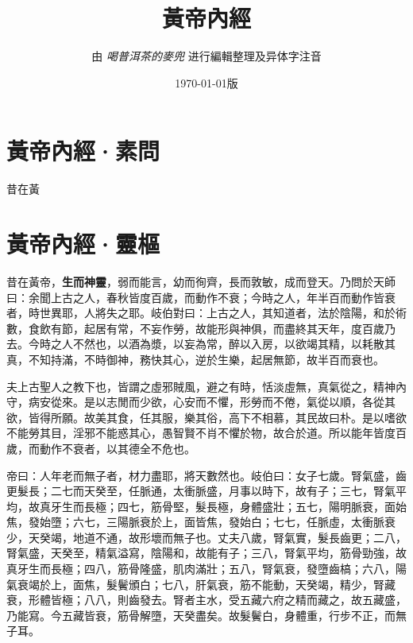 \documentclass[a4paper,zihao=-4,twoside,landscape,UTF8]{ctexart}
\title{黃帝內經}
\author{\normalsize 由 \textit{喝普洱茶的麥兜} 进行編輯整理及异体字注音}
\date{\normalsize\today 版}
\begin{document}
\maketitle

\section{黃帝內經·素問}
昔在黃

\section{黃帝內經·靈樞}

昔在黃帝，\textbf{生而神靈}，弱而能言，幼而徇齊，長而敦敏，成而登天。乃問於天師曰：余聞上古之人，春秋皆度百歲，而動作不衰；今時之人，年半百而動作皆衰者，時世異耶，人將失之耶。岐伯對曰：上古之人，其知道者，法於陰陽，和於術數，食飲有節，起居有常，不妄作勞，故能形與神俱，而盡終其天年，度百歲乃去。今時之人不然也，以酒為漿，以妄為常，醉以入房，以欲竭其精，以耗散其真，不知持滿，不時御神，務快其心，逆於生樂，起居無節，故半百而衰也。


夫上古聖人之教下也，皆謂之虛邪賊風，避之有時，恬淡虛無，真氣從之，精神內守，病安從來。是以志閒而少欲，心安而不懼，形勞而不倦，氣從以順，各從其欲，皆得所願。故美其食，任其服，樂其俗，高下不相慕，其民故曰朴。是以嗜欲不能勞其目，淫邪不能惑其心，愚智賢不肖不懼於物，故合於道。所以能年皆度百歲，而動作不衰者，以其德全不危也。

帝曰：人年老而無子者，材力盡耶，將天數然也。岐伯曰：女子七歲。腎氣盛，齒更髮長；二七而天癸至，任脈通，太衝脈盛，月事以時下，故有子；三七，腎氣平均，故真牙生而長極；四七，筋骨堅，髮長極，身體盛壯；五七，陽明脈衰，面始焦，發始墮；六七，三陽脈衰於上，面皆焦，發始白；七七，任脈虛，太衝脈衰少，天癸竭，地道不通，故形壞而無子也。丈夫八歲，腎氣實，髮長齒更；二八，腎氣盛，天癸至，精氣溢寫，陰陽和，故能有子；三八，腎氣平均，筋骨勁強，故真牙生而長極；四八，筋骨隆盛，肌肉滿壯；五八，腎氣衰，發墮齒槁；六八，陽氣衰竭於上，面焦，髮鬢頒白；七八，肝氣衰，筋不能動，天癸竭，精少，腎藏衰，形體皆極；八八，則齒發去。腎者主水，受五藏六府之精而藏之，故五藏盛，乃能寫。今五藏皆衰，筋骨解墮，天癸盡矣。故髮鬢白，身體重，行步不正，而無子耳。



\end{document}

